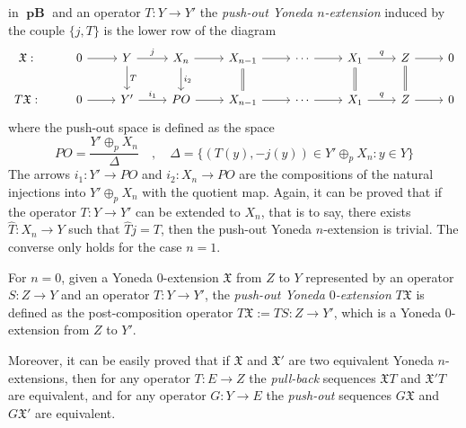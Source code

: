 \documentclass[12pt,a4paper]{amsproc}
\theoremstyle{remark}
\theoremstyle{definition}
\newcommand{\pBan}{\operatorname{\textbf{pB}}}
\numberwithin{equation}{section}
\begin{document}
	in  $\boldsymbol{\pBan}$ and an operator $T: Y \to Y'$ the \emph{push-out Yoneda $n$-extension} induced by the couple $\lbrace j, T \rbrace$ is the lower row of the diagram 
	\begin{equation}
	\notag
	\begin{tikzcd}
		\mathfrak{X}: & 0 \arrow[r] & Y \arrow[r, "j"] \arrow[d, "T"] & X_n \arrow[r] \arrow[d, "i_2"] & X_{n-1} \arrow[r] \arrow[d, equal] & \cdots \arrow[r] & X_1 \arrow[r, "q"] & Z \arrow[r] & 0 \\
		T\mathfrak{X}: & 0 \arrow[r] & Y' \arrow[r, "i_1"] & PO \arrow[r] & X_{n-1} \arrow[r] & \cdots \arrow[r] & X_1 \arrow[r, "q"] \arrow[u, equal] & Z \arrow[r] \arrow[u, equal] & 0
	\end{tikzcd}
\end{equation}
	where the push-out space is defined as the space
	$$PO=\frac{Y' \oplus_p X_n}{\Delta} \quad, \quad \Delta=\lbrace (T(y), -j(y)) \in Y' \oplus_p X_n: y \in Y \rbrace$$
	The arrows $i_1: Y' \to PO$ and $i_2:X_n \to PO$ are the compositions of the natural injections into $Y' \oplus_p X_n$ with the quotient map. 
	Again, it can be proved that if the operator $T:Y \to Y'$ can be extended to $X_n$, that is to say, there exists  $\hat{T}:X_n \to Y$ such that $\hat{T}j=T$, then the push-out Yoneda $n$-extension is trivial. The converse only holds for the case $n=1$. 
    \par For $n = 0$, given a Yoneda $0$-extension $\mathfrak{X}$ from $Z$ to $Y$ represented by an operator $S: Z \to Y$ and an operator $T: Y \to Y'$, the \emph{push-out Yoneda $0$-extension} $T\mathfrak{X}$ is defined as the post-composition operator $T\mathfrak{X} := TS: Z \to Y'$,
which is a Yoneda $0$-extension from $Z$ to $Y'$.
	\par Moreover, it can be easily proved that if $\mathfrak{X}$ and $\mathfrak{X}'$ are two equivalent Yoneda $n$-extensions, then for any operator $T:E \to Z$ the \textsl{pull-back} sequences $\mathfrak{X}T$ and $\mathfrak{X}'T$ are equivalent, and for any operator $G:Y \to E$ the  \textsl{push-out} sequences $G\mathfrak{X}$ and $G\mathfrak{X}'$ are equivalent. 
	
\end{document}
